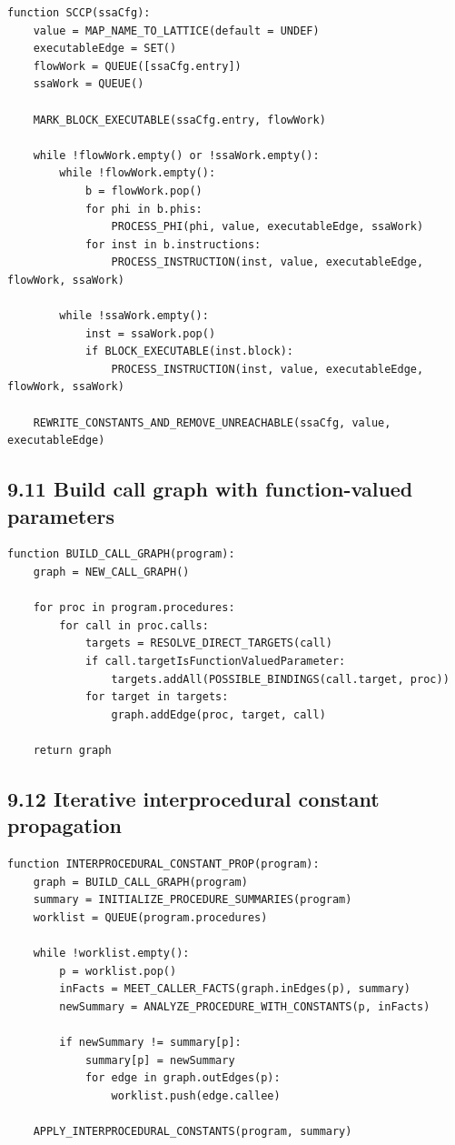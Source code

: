 \documentclass[10pt,letterpaper]{article}
\begin{document}
\begin{verbatim}
function SCCP(ssaCfg):
    value = MAP_NAME_TO_LATTICE(default = UNDEF)
    executableEdge = SET()
    flowWork = QUEUE([ssaCfg.entry])
    ssaWork = QUEUE()

    MARK_BLOCK_EXECUTABLE(ssaCfg.entry, flowWork)

    while !flowWork.empty() or !ssaWork.empty():
        while !flowWork.empty():
            b = flowWork.pop()
            for phi in b.phis:
                PROCESS_PHI(phi, value, executableEdge, ssaWork)
            for inst in b.instructions:
                PROCESS_INSTRUCTION(inst, value, executableEdge, flowWork, ssaWork)

        while !ssaWork.empty():
            inst = ssaWork.pop()
            if BLOCK_EXECUTABLE(inst.block):
                PROCESS_INSTRUCTION(inst, value, executableEdge, flowWork, ssaWork)

    REWRITE_CONSTANTS_AND_REMOVE_UNREACHABLE(ssaCfg, value, executableEdge)
\end{verbatim}

\subsection*{9.11 Build call graph with function-valued parameters}

\begin{verbatim}
function BUILD_CALL_GRAPH(program):
    graph = NEW_CALL_GRAPH()

    for proc in program.procedures:
        for call in proc.calls:
            targets = RESOLVE_DIRECT_TARGETS(call)
            if call.targetIsFunctionValuedParameter:
                targets.addAll(POSSIBLE_BINDINGS(call.target, proc))
            for target in targets:
                graph.addEdge(proc, target, call)

    return graph
\end{verbatim}

\subsection*{9.12 Iterative interprocedural constant propagation}

\begin{verbatim}
function INTERPROCEDURAL_CONSTANT_PROP(program):
    graph = BUILD_CALL_GRAPH(program)
    summary = INITIALIZE_PROCEDURE_SUMMARIES(program)
    worklist = QUEUE(program.procedures)

    while !worklist.empty():
        p = worklist.pop()
        inFacts = MEET_CALLER_FACTS(graph.inEdges(p), summary)
        newSummary = ANALYZE_PROCEDURE_WITH_CONSTANTS(p, inFacts)

        if newSummary != summary[p]:
            summary[p] = newSummary
            for edge in graph.outEdges(p):
                worklist.push(edge.callee)

    APPLY_INTERPROCEDURAL_CONSTANTS(program, summary)
\end{verbatim}
\end{document}
